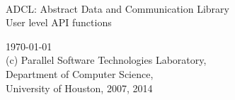 \begin{titlepage}
 \begin{center}
  \vfill
  {~}
  \vfill
  \vfill
  \vfill
  \vfill
  \vfill

    {\Large
      ADCL: Abstract Data and Communication Library \\
      User level API functions \par}
  \vfill
  \today\\
  \vfill
     {\large (c) Parallel Software Technologies Laboratory, \\
       Department of Computer Science, \\
       University of Houston, 2007, 2014}\\
  \vfill
  \vfill
  \vfill
  \vfill
\end{center}                                                     
\end{titlepage}
